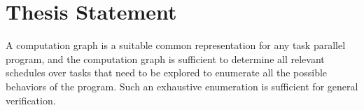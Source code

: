 \section{Thesis Statement}
A computation graph is a suitable common representation for any task parallel program, and the computation graph is sufficient to determine all relevant schedules over tasks that need to be explored to enumerate all the possible behaviors of the program. Such an exhaustive enumeration is sufficient for general verification.
